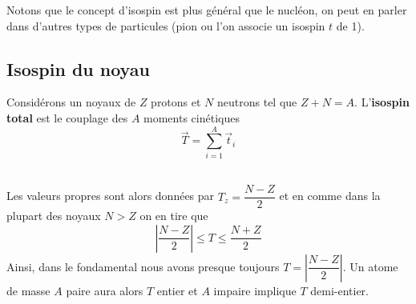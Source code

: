 	Notons que le concept d'isospin est plus général que le nucléon, on peut en parler dans d'autres types de
	particules (pion ou l'on associe un isospin $t$ de 1).

	\subsection{Isospin du noyau}
	Considérons un noyaux de $Z$ protons et $N$ neutrons tel que $Z+N=A$. L'\textbf{isospin total} est 
	le couplage des $A$ moments cinétiques
	\begin{equation}
	\vec T = \sum_{i=1}^A \vec t_i
	\end{equation}
	
	\ \\
	
	Les valeurs propres sont alors données par $T_z = \dfrac{N-Z}{2}$ et en comme dans la plupart des
	noyaux $N>Z$ on en tire que
	\begin{equation}
	\left|\dfrac{N-Z}{2}\right| \leq T \leq \dfrac{N+Z}{2}
	\end{equation}
	Ainsi, dans le fondamental nous avons presque toujours $T=\left|\dfrac{N-Z}{2}\right|$. Un atome 
	de masse $A$ paire aura alors $T$ entier et $A$ impaire implique $T$ demi-entier.\\
	
	

